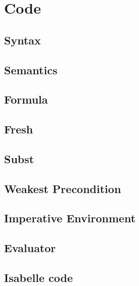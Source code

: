 \section{Code}\label{code}
\subsection{Syntax}


\subsection{Semantics}


\subsection{Formula}\label{codeformulas}


\subsection{Fresh}


\subsection{Subst}


\subsection{Weakest Precondition}


\subsection{Imperative Environment}\label{codemodel}


\subsection{Evaluator}


\subsection{Isabelle code}





